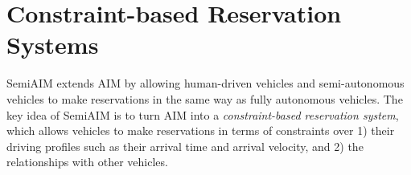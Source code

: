 \section{Constraint-based Reservation Systems}
\label{sec:constraint}

SemiAIM extends AIM by allowing human-driven vehicles and
semi-autonomous vehicles to make reservations in the same way as
fully autonomous vehicles.  The key idea of SemiAIM is to turn AIM into a
\emph{constraint-based reservation system}, which allows vehicles to
make reservations in terms of constraints over 1) their driving
profiles such as their arrival time and arrival velocity, and 2) the
relationships with other vehicles.

